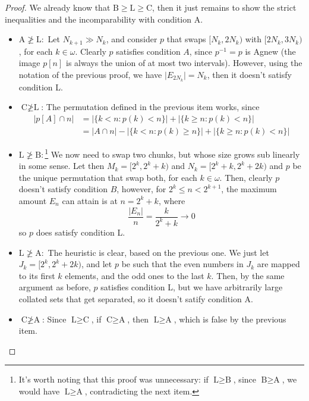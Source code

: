 \begin{proof} We already know that $\text{B}\geq\text{L}\geq\text{C}$, then it just remains to show the strict inequalities and the incomparability with condition A.
    \begin{itemize}
        \item $\text{A}\not\geq\text{L}:$ Let $N_{k+1}\gg N_k$, and consider $p$ that swaps $[N_k,2N_k)$ with $[2N_k,3N_k)$, for each $k\in\omega$. Clearly $p$ satisfies condition $A$, since $p^{-1}=p$ is Agnew (the image $p[n]$ is always the union of at most two intervals). However, using the notation of the previous proof, we have $\lvert E_{2N_k}\rvert=N_k$, then it doesn't satisfy condition L.
        
        \item $\text{C}\not\geq\text{L}$: The permutation defined in the previous item works, since
        \begin{align*}
            \lvert p[A]\cap n\rvert & = \lvert\{k<n:p(k)<n\}\rvert+\lvert\{k\geq n:p(k)<n\}\rvert\\
            & = \lvert A\cap n\rvert-\lvert\{k<n:p(k)\geq n\}\rvert+\lvert\{k\geq n:p(k)<n\}\rvert
        \end{align*}
        

        \item $\text{L}\not\geq\text{B}:$\footnote{It's worth noting that this proof was unnecessary: if $\text{L}\geq\text{B}$, since $\text{B}\geq\text{A}$, we would have $\text{L}\geq\text{A}$, contradicting the next item.} We now need to swap two chunks, but whose size grows sub linearly in some sense. Let then $M_k=[2^k,2^k+k)$ and $N_k=[2^k+k,2^k+2k)$ and $p$ be the unique permutation that swap both, for each $k\in\omega$. Then, clearly $p$ doesn't satisfy condition $B$, however, for $2^k\leq n<2^{k+1}$, the maximum amount $E_n$ can attain is at $n=2^k+k$, where
        $$\frac{\lvert E_n\rvert}n=\frac{k}{2^k+k}\to0$$
        so $p$ does satisfy condition L.
    
        \item $\text{L}\not\geq\text{A}:$ The heuristic is clear, based on the previous one. We just let $J_k=[2^k,2^k+2k)$, and let $p$ be such that the even numbers in $J_k$ are mapped to its first $k$ elements, and the odd ones to the last $k$. Then, by the same argument as before, $p$ satisfies condition L, but we have arbitrarily large collated sets that get separated, so it doesn't satify condition A.

        \item $\text{C}\not\geq\text{A}$: Since $\text{L}\geq\text{C}$, if $\text{C}\geq\text{A}$, then $\text{L}\geq\text{A}$, which is false by the previous item.


\end{itemize}
\end{proof}
